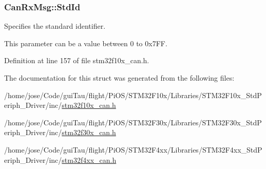 \hypertarget{struct_can_rx_msg_a62769e18836146f71238bee6b43b531e}{
\subsubsection[{Std\-Id}]{ Can\-Rx\-Msg\-::\-Std\-Id}}\label{struct_can_rx_msg_a62769e18836146f71238bee6b43b531e}
\begin{DoxyVerb}  Specifies the standard identifier.
\end{DoxyVerb}
 This parameter can be a value between 0 to 0x7\-F\-F. 

Definition at line 157 of file stm32f10x\-\_\-can.\-h.



The documentation for this struct was generated from the following files\-:\begin{DoxyCompactItemize}
\item 
/home/jose/\-Code/gui\-Tau/flight/\-Pi\-O\-S/\-S\-T\-M32\-F10x/\-Libraries/\-S\-T\-M32\-F10x\-\_\-\-Std\-Periph\-\_\-\-Driver/inc/\hyperlink{stm32f10x__can_8h}{stm32f10x\-\_\-can.\-h}\item 
/home/jose/\-Code/gui\-Tau/flight/\-Pi\-O\-S/\-S\-T\-M32\-F30x/\-Libraries/\-S\-T\-M32\-F30x\-\_\-\-Std\-Periph\-\_\-\-Driver/inc/\hyperlink{stm32f30x__can_8h}{stm32f30x\-\_\-can.\-h}\item 
/home/jose/\-Code/gui\-Tau/flight/\-Pi\-O\-S/\-S\-T\-M32\-F4xx/\-Libraries/\-S\-T\-M32\-F4xx\-\_\-\-Std\-Periph\-\_\-\-Driver/inc/\hyperlink{stm32f4xx__can_8h}{stm32f4xx\-\_\-can.\-h}\end{DoxyCompactItemize}
